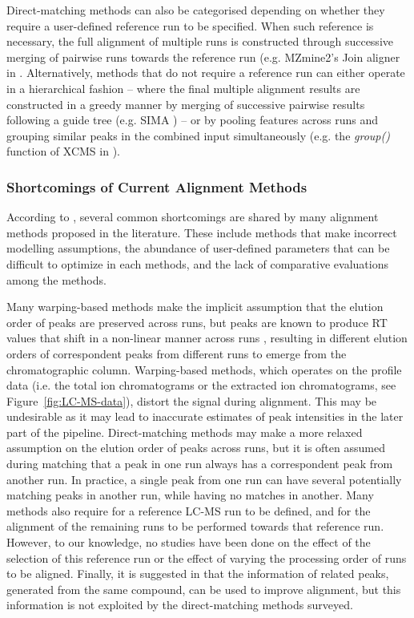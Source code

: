 Direct-matching methods can also be categorised depending on whether they require a user-defined reference run to be specified. When such reference is necessary, the full alignment of multiple runs is constructed through successive merging of pairwise runs towards the reference run (e.g. MZmine2's Join aligner in \cite{Pluskal2010}. Alternatively, methods that do not require a reference run can either operate in a hierarchical fashion -- where the final multiple alignment results are constructed in a greedy manner by merging of successive pairwise results following a guide tree (e.g. SIMA \cite{Voss2011a}) -- or by pooling features across runs and grouping similar peaks in the combined input simultaneously (e.g. the \textit{group()} function of XCMS in \cite{Smith2006}).

\subsubsection{Shortcomings of Current Alignment Methods\label{sub:limitation-in-current-methods}}

According to \cite{Smith2013}, several common shortcomings are shared by many alignment methods proposed in the literature. These include methods that make incorrect modelling assumptions, the abundance of user-defined parameters that can be difficult to optimize in each methods, and the lack of comparative evaluations among the methods. 

Many warping-based methods make the implicit assumption that the elution order of peaks are preserved across runs, but peaks are known to produce RT values that shift in a non-linear manner across runs \cite{podwojski2009retention}, resulting in different elution orders of correspondent peaks from different runs to emerge from the chromatographic column. Warping-based methods, which operates on the profile data (i.e. the total ion chromatograms or the extracted ion chromatograms, see Figure~\ref{fig:LC-MS-data}), distort the signal during alignment. This may be undesirable as it may lead to inaccurate estimates of peak intensities in the later part of the pipeline. Direct-matching methods may make a more relaxed assumption on the elution order of peaks across runs, but it is often assumed during matching that a peak in one run always has a correspondent peak from another run. In practice, a single peak from one run can have several potentially matching peaks in another run, while having no matches in another. Many methods also require for a reference LC-MS run to be defined, and for the alignment of the remaining runs to be performed towards that reference run. However, to our knowledge, no studies have been done on the effect of the selection of this reference run or the effect of varying the processing order of runs to be aligned. Finally, it is suggested in \cite{Smith2015} that the information of related peaks, generated from the same compound, can be used to improve alignment, but this information is not exploited by the direct-matching methods surveyed. 

